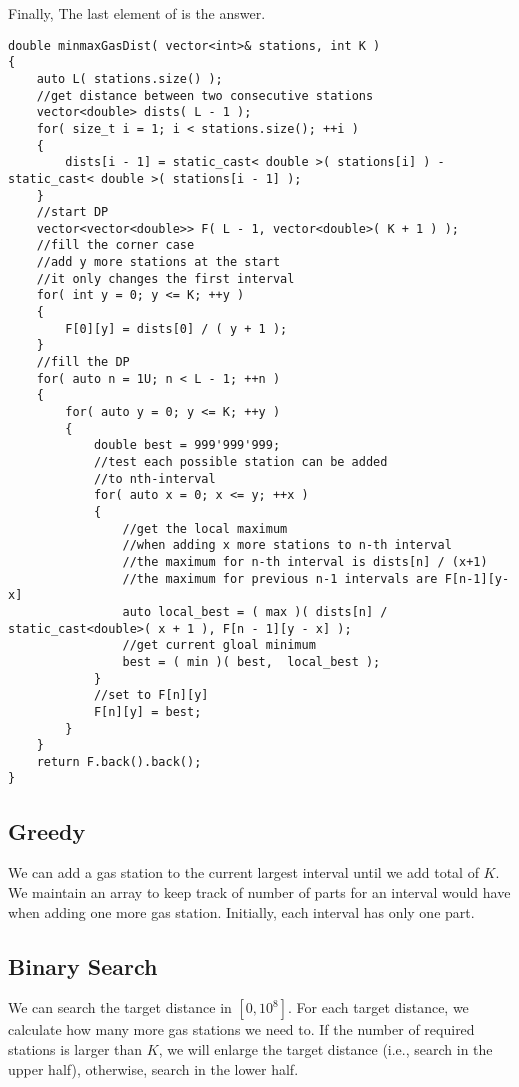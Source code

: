 Finally, The last element of  is the answer.

\setcounter{lstlisting}{0}
\begin{lstlisting}[style=customc, caption={DP[MLE]}]
double minmaxGasDist( vector<int>& stations, int K )
{
    auto L( stations.size() );
    //get distance between two consecutive stations
    vector<double> dists( L - 1 );
    for( size_t i = 1; i < stations.size(); ++i )
    {
        dists[i - 1] = static_cast< double >( stations[i] ) - static_cast< double >( stations[i - 1] );
    }
    //start DP
    vector<vector<double>> F( L - 1, vector<double>( K + 1 ) );
    //fill the corner case
    //add y more stations at the start
    //it only changes the first interval
    for( int y = 0; y <= K; ++y )
    {
        F[0][y] = dists[0] / ( y + 1 );
    }
    //fill the DP
    for( auto n = 1U; n < L - 1; ++n )
    {
        for( auto y = 0; y <= K; ++y )
        {
            double best = 999'999'999;
            //test each possible station can be added
            //to nth-interval
            for( auto x = 0; x <= y; ++x )
            {
                //get the local maximum
                //when adding x more stations to n-th interval
                //the maximum for n-th interval is dists[n] / (x+1)
                //the maximum for previous n-1 intervals are F[n-1][y-x]
                auto local_best = ( max )( dists[n] / static_cast<double>( x + 1 ), F[n - 1][y - x] );
                //get current gloal minimum
                best = ( min )( best,  local_best );
            }
            //set to F[n][y]
            F[n][y] = best;
        }
    }
    return F.back().back();
}
\end{lstlisting}

\subsection{Greedy}
We can add a gas station to the current largest interval until we add total of $K$. We maintain an array  to keep track of number of parts for an interval would have when adding one more gas station. Initially, each interval has only one part.

\subsection{Binary Search}
We can search the target distance in $[0, 10^8]$. For each target distance, we calculate how many more gas stations we need to. If the number of required stations is larger than $K$, we will enlarge the target distance (i.e., search in the upper half), otherwise, search in the lower half.

